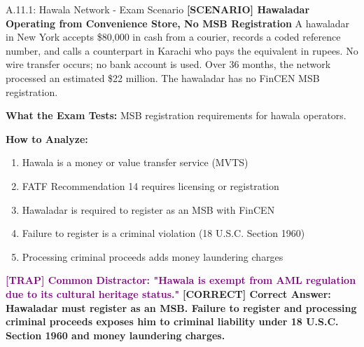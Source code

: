 \documentclass[11pt,a4paper]{beamer}
\newcommand{\trap}[1]{\textcolor{purple}{\textbf{[TRAP] #1}}}
\newcommand{\correct}[1]{\textcolor{green!50!black}{\textbf{[CORRECT] #1}}}
\newcommand{\scenario}[1]{\textcolor{blue!70!black}{\textbf{[SCENARIO] #1}}}
\begin{document}
	\begin{frame}{A.11.1: Hawala Network - Exam Scenario}
		\scenario{Hawaladar Operating from Convenience Store, No MSB Registration}
		A hawaladar in New York accepts \$80,000 in cash from a courier, records a coded reference number, and calls a counterpart in Karachi who pays the equivalent in rupees. No wire transfer occurs; no bank account is used. Over 36 months, the network processed an estimated \$22 million. The hawaladar has no FinCEN MSB registration.
		
		\vspace{0.1cm}
		\textbf{What the Exam Tests:} MSB registration requirements for hawala operators.
		
		\vspace{0.1cm}
		\textbf{How to Analyze:}
		\begin{enumerate}
			\item Hawala is a money or value transfer service (MVTS)
			\item FATF Recommendation 14 requires licensing or registration
			\item Hawaladar is required to register as an MSB with FinCEN
			\item Failure to register is a criminal violation (18 U.S.C. Section 1960)
			\item Processing criminal proceeds adds money laundering charges
		\end{enumerate}
		
		\trap{Common Distractor: "Hawala is exempt from AML regulation due to its cultural heritage status."}
		\correct{Correct Answer: Hawaladar must register as an MSB. Failure to register and processing criminal proceeds exposes him to criminal liability under 18 U.S.C. Section 1960 and money laundering charges.}
	\end{frame}
	
	
\end{document}
